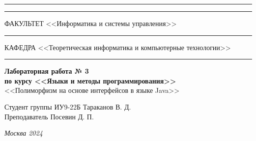 \documentclass[a4paper, 14pt]{extarticle}
\begin{document}
\begin{titlepage}
		\vspace{-25pt}
		\hspace{-35pt}\rule{\textwidth}{2.3pt}
		
		\vspace*{-20.3pt}
		\hspace{-35pt}\rule{\textwidth}{0.4pt}
		
		\vspace{1.5ex}
		\hspace{-35pt} \noindent \small ФАКУЛЬТЕТ\hspace{80pt} <<Информатика и системы управления>>
		
		\vspace*{-16pt}
		\hspace{47pt}\rule{0.83\textwidth}{0.4pt}
		
		\vspace{0.5ex}
		\hspace{-35pt} \noindent \small КАФЕДРА\hspace{50pt} <<Теоретическая информатика и компьютерные технологии>>
		
		\vspace*{-16pt}
		\hspace{30pt}\rule{0.866\textwidth}{0.4pt}
		
		\vspace{11em}
		
		\begin{center}
			\Large {\bf Лабораторная работа № 3} \\ 
			\large {\bf по курсу <<Языки и методы программирования>>} \\
			\large <<Полиморфизм на основе интерфейсов в языке Java>> 
		\end{center}\normalsize
		
		\vspace{8em}
		
		
		\begin{flushright}
			{Студент группы ИУ9-22Б Тараканов В. Д. \hspace*{15pt}\\ 
				\vspace{2ex}
				Преподаватель Посевин Д. П.\hspace*{15pt}}
		\end{flushright}
		
		\bigskip
		
		\vfill
		
		
		\begin{center}
			\textsl{Москва 2024}
		\end{center}
	\end{titlepage}
	
\end{document}
